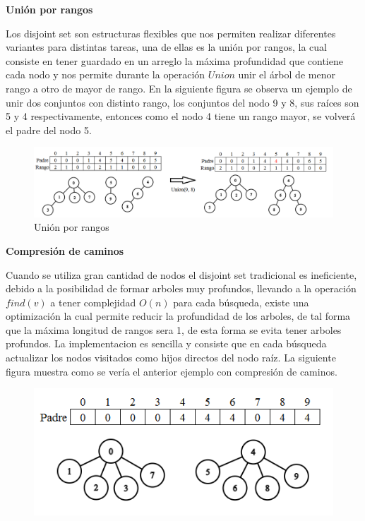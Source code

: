 \documentclass[12pt, a4paper]{article}
\newcommand\cppfile[2][]{

}
\newcommand{\subtitulo}[1]{\begin{center}\textbf{#1}\end{center}}
\begin{document}
	\cppfile[7-27]{Estructuras_de_datos/codigos/disjoint_set_union_find.cpp}
	
	\subtitulo{Unión por rangos}
	
	Los disjoint set son estructuras flexibles que nos permiten realizar diferentes variantes para distintas tareas,
	una de ellas es la unión por rangos, la cual consiste en tener guardado en un arreglo la máxima
	profundidad que contiene cada nodo y nos permite durante la operación $Union$ unir el árbol de menor rango 
	a otro de mayor de rango. En la siguiente figura se observa un ejemplo de unir dos conjuntos con distinto rango,
	los conjuntos del nodo 9 y 8, sus raíces son 5 y 4 respectivamente, entonces como el nodo 4 tiene un rango mayor, 
	se volverá el padre del nodo 5.
	
	\begin{figure}[h!]
		\centering
		\includegraphics[scale=0.6]{Estructuras_de_datos/imagenes/Disjoint_set/UnionRango}
		\caption{Unión por rangos}
	\end{figure}
	
	\cppfile[30-48]{Estructuras_de_datos/codigos/disjoint_set_union_find.cpp}
	
	\subtitulo{Compresión de caminos}
	
	Cuando se utiliza gran cantidad de nodos el disjoint set tradicional es ineficiente, debido a la posibilidad
	de formar arboles muy profundos, llevando a la operación $find(v)$ a tener complejidad $O(n)$ para cada 
	búsqueda, existe una optimización la cual permite reducir la profundidad de los arboles, de tal forma que la 
	máxima longitud de rangos sera 1, de esta forma se evita tener arboles profundos. La implementacion es sencilla
	y consiste que en cada búsqueda actualizar los nodos visitados como hijos directos del nodo raíz. La siguiente
	figura muestra como se vería el anterior ejemplo con compresión de caminos.
	
	\begin{figure}[!htb]
			\centering
			\includegraphics[scale=0.6]{Estructuras_de_datos/imagenes/Disjoint_set/Compresion}
			\caption{}
		\endminipage
			\cppfile[16-21]{Estructuras_de_datos/codigos/union_find_compresion.cpp}
		\endminipage
	\end{figure}
	
\end{document}
